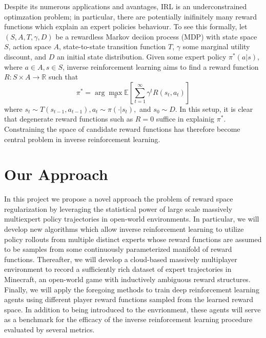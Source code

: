 \documentclass[11pt]{article}
\begin{document}
Despite its numerous applications and avantages, IRL is an underconstrained optimzation problem; in particular, there are potentially inifinitely many reward functions which explain an expert policies behaviour. To see this formally, let $(S,A,T,\gamma,D)$ be a rewardless Markov deciion process (MDP) with state space $S$, action space $A$, state-to-state transition function $T$, $\gamma$ some marginal utility discount, and $D$ an initial state distribution. Given some expert policy $\pi^*(a | s )$, where $a \in A, s \in S$, inverse reinforcement learning aims to find a reward function $R: S \times A \to \mathbb{R}$ such that 
\begin{equation}
	\pi^* = \arg \max_{\pi} \mathbb{E}\left[\sum_{t=1}^\infty \gamma^t  R(s_t, a_t)\right]
\end{equation}
where $s_t \sim T(s_{t-1}, a_{t-1}), a_t \sim \pi(\cdot | s_t),$ and $s_0 \sim D.$ In this setup, it is clear that degenerate reward functions such as $R = 0$ suffice in explainig $\pi^*.$ Constraining the space of candidate reward functions has therefore become central problem in inverse reinforcement learning. 








\section{Our Approach}

In this project we propose a novel approach the problem of reward space regularization by leveraging the statistical power of large scale massively multiexpert policy trajectories in open-world environments. In particular, we will develop new algorithms which allow inverse reinforcement learning to utilize policy rollouts from multiple distinct experts whose reward functions are assumed to be samples from some continuously parameterized manifold of reward functions. Thereafter, we will develop a cloud-based massively multiplayer environment to record a sufficiently rich dataset of expert trajectories in Minecraft, an open-world game with inductively ambiguous reward structures. Finally, we will apply the foregoing methods to train deep reinforcement learning agents using different player reward functions sampled from the learned reward space. In addition to being introduced to the envrionment, these agents will serve as a benchmark for the efficacy of the inverse reinforcement learning procedure evaluated by several metrics.\\
\end{document}
